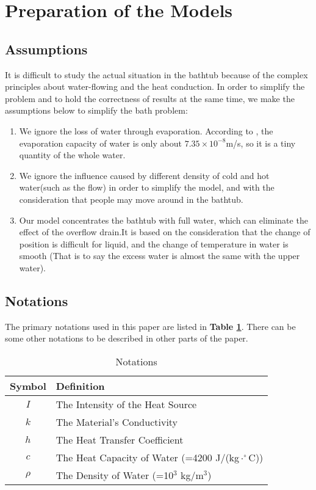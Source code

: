 \documentclass{HZNUMCM}
\begin{document}
\section{Preparation of the Models}
\subsection{Assumptions}
It is difficult to study the actual situation in the bathtub because of the complex principles about
water-flowing and the heat conduction. In order to simplify the problem and to hold the correctness
of results at the same time, we make the assumptions below to simplify the bath
problem:
\begin{enumerate}[\bfseries 1.]
    \item We ignore the loss of water through evaporation. According to \cite{2011_Ozturk_1532,2010_nakata_MR2680013,2009_li_R2451705,2009_muroya_MR2481600}, the evaporation
    capacity of water is only about $7.35\times10^{-8}$m/s, so it is a tiny quantity of the whole
    water.
    \item We ignore the influence caused by different density of cold and hot water(such as the
    flow) in order to simplify the model, and with the consideration that people may move around in
    the bathtub.
    \item Our model concentrates the bathtub with full water, which can eliminate the effect of the
    overflow drain.It is based on the consideration that the change of position is difficult for
    liquid, and the change of temperature in water is smooth (That is to say the excess water is
    almost the same with the upper water).
\end{enumerate}

\subsection{Notations}
The primary notations used in this paper are listed in \textbf{Table \ref{Ntt}}. There can be some
other notations to be described in other parts of the paper.
\begin{table}[!htbp]
\begin{center}
\caption{Notations}
\begin{tabular}{cl}
    \toprule
    \multicolumn{1}{m{3cm}}{\centering Symbol}
    &\multicolumn{1}{m{8cm}}{\centering Definition}\\
    \midrule
    $I$&The Intensity of the Heat Source\\
    $k$&The Material's Conductivity\\
    $h$&The Heat Transfer Coefficient\\
    $c$&The Heat Capacity of Water (=4200 J/(kg$\cdot^\circ$C))\\
    $\rho$&The Density of Water (=10$^3$ kg/m$^3$)\\
    \bottomrule
\end{tabular}\label{Ntt}
\end{center}
\end{table}
\end{document}

